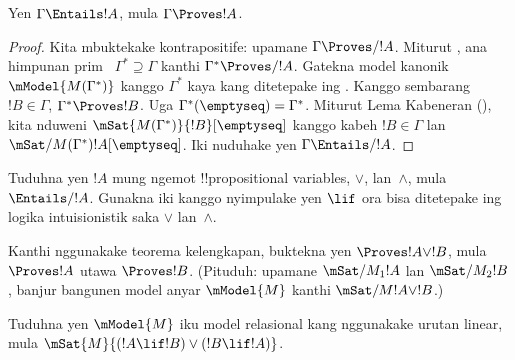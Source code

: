 \documentclass[../../../include/open-logic-section]{subfiles}
\begin{document}


\begin{thm}
  Yen $\Gamma \Entails !A$, mula $\Gamma \Proves !A$.
\end{thm}

\begin{proof}
  Kita mbuktekake kontrapositife: upamane $\Gamma \Proves/ !A$.
  Miturut , ana himpunan prim
  ~$\Gamma^* \supseteq \Gamma$ kanthi $\Gamma^* \Proves/ !A$.
  Gatekna model kanonik~$\mModel{M(\Gamma^*)}$ kanggo $\Gamma^*$
  kaya kang ditetepake ing .
  Kanggo sembarang $!B \in \Gamma$, $\Gamma^* \Proves !B$.
  Uga $\Gamma^*(\emptyseq) = \Gamma^*$. Miturut Lema Kabeneran
  (), kita nduweni
  $\mSat{M(\Gamma^*)}{!B}[\emptyseq]$ kanggo kabeh $!B \in \Gamma$
  lan $\mSat/{M(\Gamma^*)}{!A}[\emptyseq]$. Iki nuduhake yen
  $\Gamma \Entails/ !A$.
\end{proof}

\begin{prob}
  Tuduhna yen $!A$ mung ngemot !!{propositional variable}s, $\lor$,
  lan~$\land$, mula $\Entails/ !A$. Gunakna iki kanggo nyimpulake yen
  $\lif$ ora bisa ditetepake ing logika intuisionistik saka $\lor$
  lan~$\land$.
\end{prob}
  
\begin{prob}
  Kanthi nggunakake teorema kelengkapan, buktekna yen $\Proves !A \lor !B$,
  mula $\Proves !A$ utawa $\Proves !B$. (Pituduh: upamane
  $\mSat/{M_1}{!A}$ lan $\mSat/{M_2}{!B}$, banjur bangunen model anyar
  $\mModel{M}$ kanthi $\mSat/{M}{!A \lor !B}$.)
\end{prob}
  
\begin{prob} 
  Tuduhna yen $\mModel{M}$ iku model relasional kang nggunakake
  urutan linear, mula $\mSat{M}{(!A \lif !B)\lor(!B \lif !A)}$.
\end{prob}
\end{document}
